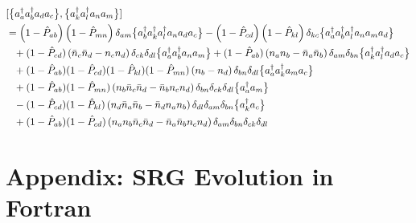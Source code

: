 \begin{align}
  &\comm{\nord{\aaO_{a}\aaO_{b}\aO_{d}\aO_{c}}}{\nord{\aaO_{k}\aaO_{l}\aO_{n}\aO_{m}}}
  \notag\\
  &=
    \left(1-\PO_{ab}\right)\left(1-\PO_{mn}\right)\delta_{am}\nord{\aaO_{b}\aaO_{k}\aaO_{l}\aO_{n}\aO_{d}\aO_{c}}
    -\left(1-\PO_{cd}\right)\left(1-\PO_{kl}\right)\delta_{kc}\nord{\aaO_{a}\aaO_{b}\aaO_{l}\aO_{n}\aO_{m}\aO_{d}}
  \notag\\
%  
  &\hphantom{=}
    +(1-\PO_{cd})\left(\nn_{c}\nn_{d} - n_c n_d \right)\delta_{ck}\delta_{dl}\nord{\aaO_{a}\aaO_{b}\aO_{n}\aO_{m}}
    +(1-\PO_{ab})\left(n_a n_b -\nn_{a} \nn_{b} \right)\delta_{am}\delta_{bn}\nord{\aaO_{k}\aaO_{l}\aO_{d}\aO_{c}}
  \notag\\
  &\hphantom{=}
    +(1-\PO_{ab})(1-\PO_{cd})(1-\PO_{kl})(1-\PO_{mn})\left(n_{b} - n_{d}\right)\delta_{bn}\delta_{dl}
    \nord{\aaO_{a}\aaO_{k}\aO_{m}\aO_{c}}
  \notag\\
%
  &\hphantom{=}
   +(1-\PO_{ab})(1-\PO_{mn})\left(n_{b}\nn_{c}\nn_{d} - \nn_{b}n_{c}n_{d}\right)\delta_{bn}\delta_{ck}\delta_{dl}
   \nord{\aaO_{a}\aO_{m}}
  \notag\\
% 
  &\hphantom{=}
   -(1-\PO_{cd})(1-\PO_{kl})\left(n_{d}\nn_{a}\nn_{b} - \nn_{d}n_{a}n_{b}\right)\delta_{dl}\delta_{am}\delta_{bn}
   \nord{\aaO_{k}\aO_{c}}
  \notag\\
% 
% 
  &\hphantom{=}
  +(1-\PO_{ab})(1-\PO_{cd})
    \left(n_{a} n_{b} \nn_{c} \nn_{d} - \nn_{a} \nn_{b} n_{c} n_{d}\right)\delta_{am}\delta_{bn}\delta_{ck}\delta_{dl}
% 
\end{align}


\section*{Appendix: SRG Evolution in Fortran}



% 

